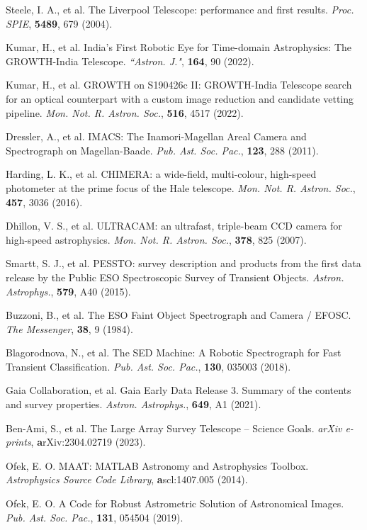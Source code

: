 \documentclass{nature_plusfigure}
\newcommand{\mn}{{Mon. Not. R. Astron. Soc.}}
\newcommand{\mnras}{\mn}
\newcommand{\aj}{{``Astron. J."}}
\newcommand{\aap}{{Astron. Astrophys.}}
\newcommand{\pasp}{{Pub. Ast. Soc. Pac.}}
\newcommand{\procspie}{Proc. SPIE}
\begin{document}
\begin{methods}
\begin{thebibliography}{10}
 Steele, I. A., et al. The Liverpool Telescope: performance and first results. \emph{\procspie}, \textbf{5489}, 679 (2004). 

 Kumar, H., et al. India's First Robotic Eye for Time-domain Astrophysics: The GROWTH-India Telescope. \emph{\aj}, \textbf{164}, 90 (2022). 

 Kumar, H., et al. GROWTH on S190426c II: GROWTH-India Telescope search for an optical counterpart with a custom image reduction and candidate vetting pipeline. \emph{\mnras}, \textbf{516}, 4517 (2022). 

 Dressler, A., et al. IMACS: The Inamori-Magellan Areal Camera and Spectrograph on Magellan-Baade. \emph{\pasp}, \textbf{123}, 288 (2011). 

 Harding, L. K., et al. CHIMERA: a wide-field, multi-colour, high-speed photometer at the prime focus of the Hale telescope. \emph{\mnras}, \textbf{457}, 3036 (2016). 

 Dhillon, V. S., et al. ULTRACAM: an ultrafast, triple-beam CCD camera for high-speed astrophysics. \emph{\mnras}, \textbf{378}, 825 (2007). 

  Smartt, S. J., et al. PESSTO: survey description and products from the first data release by the Public ESO Spectroscopic Survey of Transient Objects. \emph{\aap}, \textbf{579}, A40 (2015). 

 Buzzoni, B., et al. The ESO Faint Object Spectrograph and Camera / EFOSC. \emph{The Messenger}, \textbf{38}, 9 (1984). 

  Blagorodnova, N., et al. The SED Machine: A Robotic Spectrograph for Fast Transient Classification. \emph{\pasp}, \textbf{130}, 035003 (2018). 
 
  Gaia Collaboration, et al. Gaia Early Data Release 3. Summary of the contents and survey properties. \emph{\aap}, \textbf{649}, A1 (2021). 

 Ben-Ami, S., et al. The Large Array Survey Telescope -- Science Goals. \emph{arXiv e-prints}, \textbf arXiv:2304.02719 (2023). 

 Ofek, E. O. MAAT: MATLAB Astronomy and Astrophysics Toolbox. \emph{Astrophysics Source Code Library}, \textbf ascl:1407.005 (2014). 

 Ofek, E. O. A Code for Robust Astrometric Solution of Astronomical Images. \emph{\pasp}, \textbf{131}, 054504 (2019). 


\end{thebibliography}
\end{methods}
\end{document}
